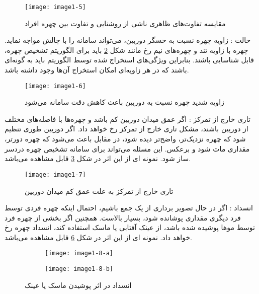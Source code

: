\begin{figure}[!h]
\centering
\texttt{[image: image1-5]}
\caption{مقایسه تفاوت‌های ظاهری ناشی از روشنایی و تفاوت بین چهره افراد \cite{6196234}}
\label{image1-5}
\end{figure}

\noindent
حالت : زاویه چهره نسبت به حسگر دوربین، می‌تواند سامانه را با چالش مواجه نماید. چهره با زاویه تند و چهره‌های نیم رخ مانند شکل \ref{image1-6} باید برای الگوریتم تشخیص چهره، قابل شناسایی باشند. بنابراین ویژگی‌های استخراج شده توسط الگوریتم باید به گونه‌ای باشند که در هر زاویه‌ای امکان استخراج آن‌ها وجود داشته باشد.
\begin{figure}[!h]
\centering
\texttt{[image: image1-6]}
\caption{زاویه شدید چهره نسبت به دوربین باعث کاهش دقت سامانه می‌شود \cite{6475017}}
\label{image1-6}
\end{figure}

\noindent
تاری خارج از تمرکز : اگر عمق میدان دوربین کم باشد و چهره‌ها با فاصله‌های مختلف از دوربین باشند، مشکل تاری خارج از تمرکز رخ خواهد داد. اگر دوربین طوری تنظیم شود که چهره نزدیک‌تر، واضح‌تر دیده شود، در مقابل باعث می‌شود که چهره دورتر، مقداری مات شود و برعکس. این مسئله می‌تواند برای سامانه تشخیص چهره دردسر ساز شود. نمونه ای از این اثر در شکل \ref{image1-7} قابل مشاهده می‌باشد.

\begin{figure}[!h]
\centering
\texttt{[image: image1-7]}
\caption{تاری خارج از تمرکز به علت عمق کم میدان دوربین \cite{7477452}}
\label{image1-7}
\end{figure}

\noindent
انسداد : اگر در حال تصویر برداری از یک جمع باشیم، احتمال اینکه چهره فردی توسط فرد دیگری مقداری پوشانده شود، بسیار بالاست. همچنین اگر بخشی از چهره فرد توسط موها پوشیده شده باشد، از عینک آفتابی یا ماسک استفاده کند، انسداد چهره رخ خواهد داد. نمونه ای از این اثر در شکل \ref{image1-8} قابل مشاهده می‌باشد.

\begin{figure}
	\centering
	\begin{subfigure}{.25\textwidth}
		\centering
		\texttt{[image: image1-8-a]}
		\label{image1-8-a}
	\end{subfigure}
	\begin{subfigure}{.25\textwidth}
		\centering
		\texttt{[image: image1-8-b]}
		\label{image1-8-b}
	\end{subfigure}
	\caption{انسداد در اثر پوشیدن ماسک یا عینک}
	\label{image1-8}
\end{figure}

